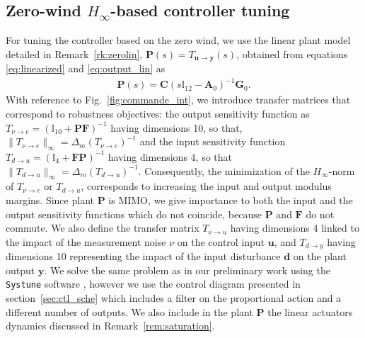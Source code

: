 \subsection{\texorpdfstring{Zero-wind $H_{\infty}$}{H {infty}}-based controller tuning }
\label{sec:zerowind}
For tuning the controller based on the zero wind, we use the linear plant model detailed in Remark~\ref{rk:zerolin}, $\boldsymbol{P}(s) = T_{\boldsymbol{u} \rightarrow \boldsymbol{y}}(s)$, obtained from equations \eqref{eq:linearized} and \eqref{eq:output_lin} as
\begin{align*}
    \boldsymbol{P}(s) = \boldsymbol{C} (s \mathbb{I}_{12} - \boldsymbol{A}_{0})^{-1} \boldsymbol{G}_{0}.
\end{align*} 
With reference to Fig.~\ref{fig:commande_int}, we introduce transfer matrices that correspond to robustness objectives: the output sensitivity function as $T_{\nu \rightarrow e}=(\mathbb{I}_{10}+\boldsymbol{P}\boldsymbol{F})^{-1}$ having dimensions 10, so that, $\lVert T_{\nu \rightarrow e} \rVert_{\infty}=\Delta_m(T_{\nu \rightarrow e})^{-1} $
and the input sensitivity function $T_{d \rightarrow u}=(\mathbb{I}_{4}+\boldsymbol{F}\boldsymbol{P})^{-1}$ having dimensions 4, so that $\lVert T_{d \rightarrow u} \rVert_{\infty}=\Delta_m(T_{d \rightarrow u})^{-1}$.
Consequently, the minimization of the  $H_{\infty}$-norm of $T_{\nu \rightarrow e}$ or $T_{d \rightarrow u}$, corresponds to increasing the input and output modulus margins. Since plant $\boldsymbol{P}$ is MIMO, we give importance to both the input and the output sensitivity functions which do not coincide, because $\boldsymbol{P}$ and $\boldsymbol{F}$ do not commute.
%
We also define the transfer matrix $T_{\nu \rightarrow u}$ having dimensions 4 linked to the impact of the measurement noise $\nu$ on the control input $\boldsymbol{u}$, and $T_{d \rightarrow y}$ having dimensions 10 representing the impact of the input disturbance $\boldsymbol{d}$ on the plant output $\boldsymbol{y}$. 
We solve the same problem as in our preliminary work \cite[eqn. (13)]{SANSOUACA} using the {\tt Systune} software \cite{1576856}, however we use the control diagram presented in section~\ref{sec:ctl_sche} which includes a filter on the proportional action and a different number of outputs. We also include in the plant $\boldsymbol{P}$ the linear actuators dynamics discussed in Remark~\ref{rem:saturation}.

